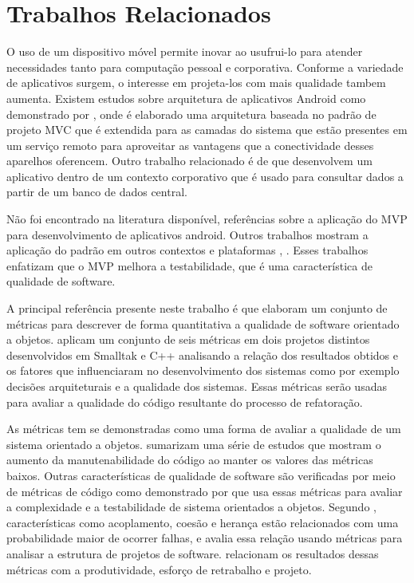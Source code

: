 \section{Trabalhos Relacionados}

O uso de um dispositivo móvel permite inovar ao usufrui-lo para atender
necessidades tanto para computação pessoal e corporativa. Conforme a variedade
de aplicativos surgem, o interesse em projeta-los com mais qualidade tambem
aumenta. Existem estudos sobre arquitetura de aplicativos Android como
demonstrado por , onde é elaborado uma arquitetura baseada no
padrão de projeto MVC que é extendida para as camadas do sistema que estão
presentes em um serviço remoto para aproveitar as vantagens que a conectividade
desses aparelhos oferencem. Outro trabalho relacionado é
de  que desenvolvem um aplicativo dentro de um
contexto corporativo que é usado para consultar dados a partir de um banco de
dados central.

Não foi encontrado na literatura disponível, referências sobre a aplicação do
MVP para desenvolvimento de aplicativos android. Outros trabalhos mostram a
aplicação do padrão em outros contextos e plataformas  \cite{presenterfirst},
\cite{yangmvp}. Esses trabalhos enfatizam que o MVP melhora a
testabilidade, que é uma característica de qualidade de software.

A principal referência presente neste trabalho é  que
elaboram um conjunto de métricas para descrever de forma quantitativa a
qualidade de software orientado a objetos.  aplicam um
conjunto de seis métricas em dois projetos distintos desenvolvidos em Smalltak e
C++ analisando a relação dos resultados obtidos e os fatores que influenciaram
no desenvolvimento dos sistemas como por exemplo decisões arquiteturais e a
qualidade dos sistemas. Essas métricas serão usadas para avaliar a qualidade do
código resultante do processo de refatoração.

As métricas  tem se demonstradas como uma forma de avaliar a
qualidade de um sistema orientado a objetos.  sumarizam
uma série de estudos que mostram o aumento da manutenabilidade do código ao
manter os valores das métricas baixos. Outras características de
qualidade de software são verificadas por meio de métricas de código
como demonstrado por  que usa essas métricas para
avaliar a complexidade e a testabilidade de sistema orientados a objetos.
Segundo , características como acoplamento, coesão e
herança estão relacionados com uma probabilidade maior de ocorrer falhas, e
avalia essa relação usando métricas para analisar a estrutura de projetos de
software.  relacionam os resultados dessas métricas com a
produtividade, esforço de retrabalho e projeto.

